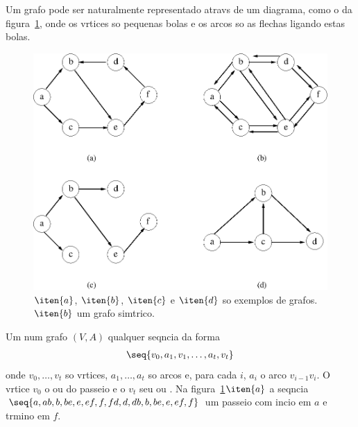 Um grafo pode ser naturalmente representado atravs de um
diagrama, como o da figura~\ref{fig:grafo}, onde os vrtices so
pequenas bolas e os arcos so as flechas ligando estas bolas. 

\begin{figure}[htbp]
 \begin{center}
  \includegraphics{./figs/grafo.eps}
  \caption{\label{fig:grafo} $\iten{a}$, $\iten{b}$, $\iten{c}$ e 
    $\iten{d}$ so exemplos de grafos. $\iten{b}$  um grafo simtrico.}
 \end{center}
 \end{figure}

 Um  num grafo $(V,A)$  qualquer seqncia da forma
 \begin{eqnarray}
 \label{passeio}
 \seq{v_{0}, a_{1}, v_{1}, \ldots, a_{t}, v_{t}}
 \end{eqnarray}
onde $v_{0}, \ldots, v_{t}$ so vrtices, $a_{1}, \ldots, a_{t}$ 
so arcos e, para cada $i$, $a_{i}$  o arco $v_{i-1}v_{i}$. 
O vrtice
$v_{0}$  o  ou  do passeio
e o $v_{t}$  seu  ou .
Na figura~\ref{fig:grafo}$\iten{a}$ a seqncia
$\seq{a, ab, b, be, e, ef, f, fd, d, db, b, be, e, ef, f}$  um passeio com incio em $a$ e 
 trmino em $f$.

